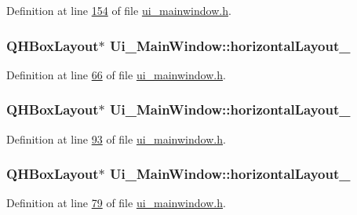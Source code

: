 Definition at line \hyperlink{a00139_source_l00154}{154} of file \hyperlink{a00139_source}{ui\+\_\+mainwindow.\+h}.

\hypertarget{a00080_a80867018070156432923d0266cc9fe25}{
\subsubsection[{horizontal\+Layout\+\_\+2}]{\setlength{\rightskip}{0pt plus 5cm}Q\+H\+Box\+Layout$\ast$ Ui\+\_\+\+Main\+Window\+::horizontal\+Layout\+\_}}\label{a00080_a80867018070156432923d0266cc9fe25}


Definition at line \hyperlink{a00139_source_l00066}{66} of file \hyperlink{a00139_source}{ui\+\_\+mainwindow.\+h}.

\hypertarget{a00080_a2071e5a4c77a64f74d74ac246bbc683c}{
\subsubsection[{horizontal\+Layout\+\_\+22}]{\setlength{\rightskip}{0pt plus 5cm}Q\+H\+Box\+Layout$\ast$ Ui\+\_\+\+Main\+Window\+::horizontal\+Layout\+\_}}\label{a00080_a2071e5a4c77a64f74d74ac246bbc683c}


Definition at line \hyperlink{a00139_source_l00093}{93} of file \hyperlink{a00139_source}{ui\+\_\+mainwindow.\+h}.

\hypertarget{a00080_a17c8bb967f8ecc58406ac7ca1bec7b7e}{
\subsubsection[{horizontal\+Layout\+\_\+23}]{\setlength{\rightskip}{0pt plus 5cm}Q\+H\+Box\+Layout$\ast$ Ui\+\_\+\+Main\+Window\+::horizontal\+Layout\+\_}}\label{a00080_a17c8bb967f8ecc58406ac7ca1bec7b7e}


Definition at line \hyperlink{a00139_source_l00079}{79} of file \hyperlink{a00139_source}{ui\+\_\+mainwindow.\+h}.

